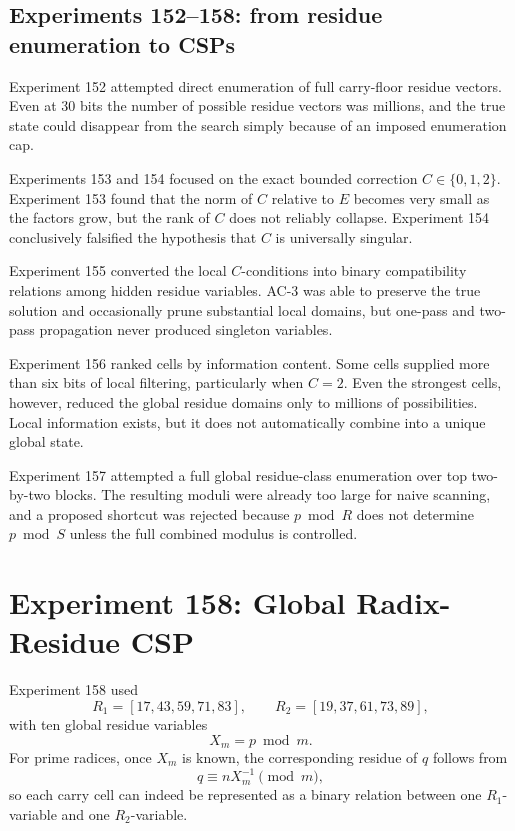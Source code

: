 \documentclass[11pt,a4paper]{article}
\begin{document}
\subsection{Experiments 152--158: from residue enumeration to CSPs}
Experiment 152 attempted direct enumeration of full carry-floor residue vectors. Even at 30 bits the number of possible residue vectors was millions, and the true state could disappear from the search simply because of an imposed enumeration cap.

Experiments 153 and 154 focused on the exact bounded correction \(C\in\{0,1,2\}\). Experiment 153 found that the norm of \(C\) relative to \(E\) becomes very small as the factors grow, but the rank of \(C\) does not reliably collapse. Experiment 154 conclusively falsified the hypothesis that \(C\) is universally singular.

Experiment 155 converted the local \(C\)-conditions into binary compatibility relations among hidden residue variables. AC-3 was able to preserve the true solution and occasionally prune substantial local domains, but one-pass and two-pass propagation never produced singleton variables.

Experiment 156 ranked cells by information content. Some cells supplied more than six bits of local filtering, particularly when \(C=2\). Even the strongest cells, however, reduced the global residue domains only to millions of possibilities. Local information exists, but it does not automatically combine into a unique global state.

Experiment 157 attempted a full global residue-class enumeration over top two-by-two blocks. The resulting moduli were already too large for naive scanning, and a proposed shortcut was rejected because \(p\bmod R\) does not determine \(p\bmod S\) unless the full combined modulus is controlled.

\section{Experiment 158: Global Radix-Residue CSP}
Experiment 158 used
\[
R_1=[17,43,59,71,83],
\qquad
R_2=[19,37,61,73,89],
\]
with ten global residue variables
\[
X_m=p\bmod m.
\]
For prime radices, once \(X_m\) is known, the corresponding residue of \(q\) follows from
\begin{equation}
    q\equiv nX_m^{-1}\pmod m,
\end{equation}
so each carry cell can indeed be represented as a binary relation between one \(R_1\)-variable and one \(R_2\)-variable.
\end{document}
